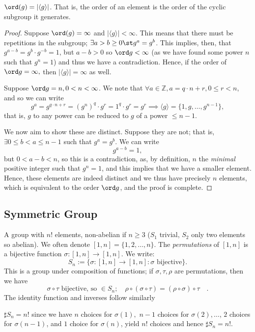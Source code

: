 \documentclass[12pt,oneside]{article}
\begin{document}
\begin{proposition}\label{prop:ordergroups}
  $\ord (g) = |\langle g \rangle|$. That is, the order of an element is the order of the cyclic subgroup it generates.
\end{proposition}

\begin{proof}
  Suppose $\ord (g) = \infty$ and $|\langle g\rangle| < \infty$. This means that there must be repetitions in the subgroup; $\exists a > b \geq 0 \st g^{a} = g^{b}$. This implies, then, that $g^{a-b} = g^b \cdot g^{-b} = 1$, but $a - b > 0$ so $\ord g < \infty$ (as we have found some power $n$ such that $g^n = 1$) and thus we have a contradiction. Hence, if the order of $\ord g = \infty,$ then $|\langle g\rangle| = \infty$ as well.

  Suppose $\ord g = n, 0 <n < \infty$. We note that $\forall a \in \mathbb{Z}, a = q \cdot n + r, 0 \leq r < n$, and so we can write \[
  g^a = g^{q\cdot n + r}  = (g^{n})^q\cdot g^r = 1^q \cdot g^r = g^r \implies \langle g\rangle  = \{1, g, \dots, g^{n-1}\},
  \]
  that is, $g$ to any power can be reduced to $g$ of a power $\leq n-1$. 
  
  We now aim to show these are distinct. Suppose they are not; that is, $\exists 0 \leq b < a \leq n - 1$ such that $g^a = g^b$. We can write \[
  g^{a-b} = 1,  
  \]
  but $0 <a - b < n$, so this is a contradiction, as, by definition, $n$ the \emph{minimal} positive integer such that $g^n = 1$, and this implies that we have a smaller element. Hence, these elements are indeed distinct and we thus have precisely $n$ elements, which is equivalent to the order $\ord g$, and the proof is complete.
\end{proof}

\subsection{Symmetric Group}

\begin{definition}
  A group with $n!$ elements, non-abelian if $n \geq 3$ ($S_1$ trivial, $S_2$ only two elements so abelian). We often denote $[1, n] = \{1, 2, \dots, n\}$. The \emph{permutations} of $[1,n]$ is a bijective function $\sigma: [1, n] \to [1,n]$. We write:
  \[
  S_n := \{\sigma : [1, n] \to [1, n] : \sigma \text{ bijective}\}.
  \]
  This is a group under composition of functions; if $\sigma, \tau, \rho$ are permutations, then we have \[
  \sigma \circ \tau \text{ bijective, so } \in S_n; \quad \rho \circ (\sigma \circ \tau)  = (\rho \circ \sigma) \circ \tau \quad.
  \]
  The identity function and inverses follow similarly %

  $\sharp S_n = n!$ since we have $n$ choices for $\sigma (1),$ $n -1$ choices for $\sigma (2), \dots$, $2$ choices for $\sigma (n-1)$, and $1$ choice for $\sigma (n)$, yield $n!$ choices and hence $\sharp S_n = n!$.
\end{definition}
\end{document}
